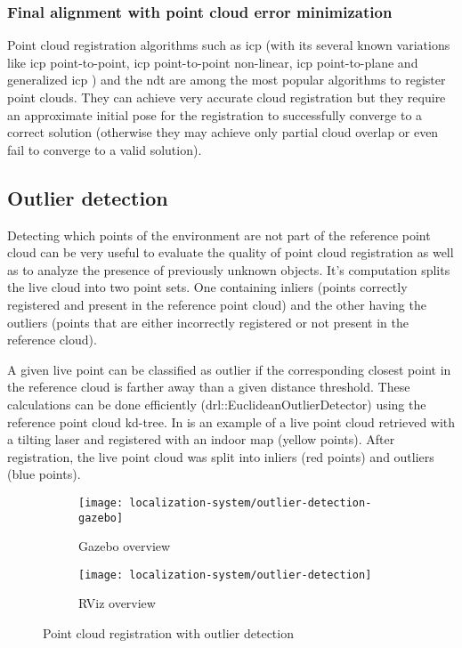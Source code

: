\subsubsection{Final alignment with point cloud error minimization}

Point cloud registration algorithms such as \gls{icp} \cite{Besl1992a} (with its several known variations \cite{Rusinkiewicz2001,Pomerleau2013} like \gls{icp} point-to-point, \gls{icp} point-to-point non-linear, \gls{icp} point-to-plane and generalized \gls{icp} \cite{Segal2009}) and the \gls{ndt} \cite{Magnusson2009} are among the most popular algorithms to register point clouds. They can achieve very accurate cloud registration but they require an approximate initial pose for the registration to successfully converge to a correct solution (otherwise they may achieve only partial cloud overlap or even fail to converge to a valid solution).


\subsection{Outlier detection}

Detecting which points of the environment are not part of the reference point cloud can be very useful to evaluate the quality of point cloud registration as well as to analyze the presence of previously unknown objects. It's computation splits the live cloud into two point sets. One containing inliers (points correctly registered and present in the reference point cloud) and the other having the outliers (points that are either incorrectly registered or not present in the reference cloud).

A given live point can be classified as outlier if the corresponding closest point in the reference cloud is farther away than a given distance threshold. These calculations can be done efficiently (drl::EuclideanOutlierDetector) using the reference point cloud kd-tree. In  is an example of a live point cloud retrieved with a tilting laser and registered with an indoor map (yellow points). After registration, the live point cloud was split into inliers (red points) and outliers (blue points).


\begin{figure}
	\centering
	\begin{subfigure}[ht]{0.49\textwidth}
		\centering
		\texttt{[image: localization-system/outlier-detection-gazebo]}
		\caption{Gazebo overview}
	\end{subfigure}
	\begin{subfigure}[ht]{0.49\textwidth}
		\centering
		\texttt{[image: localization-system/outlier-detection]}
		\caption{RViz overview}
	\end{subfigure}\hfill
	\caption{Point cloud registration with outlier detection}
	\label{fig:localization-system_outlier-detection}
\end{figure}


